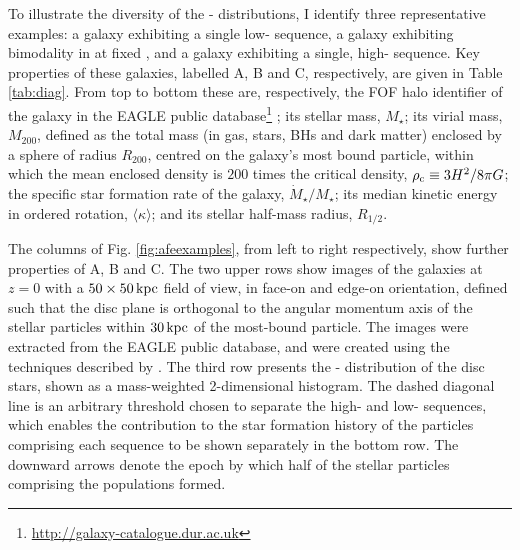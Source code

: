 To illustrate the diversity of the \afe{}-\feh{} distributions, I identify three representative examples: a galaxy exhibiting a single low-\afe{} sequence, a galaxy exhibiting bimodality in \afe{} at fixed \feh{}, and a galaxy exhibiting a single, high-\afe{} sequence. Key properties of these galaxies, labelled A, B and C, respectively, are given in Table \ref{tab:diag}. From top to bottom these are, respectively, the FOF halo identifier of the galaxy in the EAGLE public database\footnote{\url{http://galaxy-catalogue.dur.ac.uk}} \citep{2016A&C....15...72M}; its stellar mass, $M_\star$; its virial mass, $M_{200}$, defined as the total mass (in gas, stars, BHs and dark matter) enclosed by a sphere of radius $R_{200}$, centred on the galaxy's most bound particle, within which the mean enclosed density is $200$ times the critical density, $\rho_{\rm c} \equiv 3H^2/8\pi G$; the specific star formation rate of the galaxy, $\dot{M}_\star/M_\star$; its median kinetic energy in ordered rotation, $\langle \kappa \rangle$; and its stellar half-mass radius, $R_{1/2}$. 

The columns of Fig. \ref{fig:afeexamples}, from left to right respectively, show further properties of A, B and C. The two upper rows show images of the galaxies at $z=0$ with a $50 \times 50\,{\rm kpc}$ field of view, in face-on and edge-on orientation, defined such that the disc plane is orthogonal to the angular momentum axis of the stellar particles within $30\,{\rm kpc}$ of the most-bound particle. The images were extracted from the EAGLE public database, and were created using the techniques described by \citet{2015MNRAS.452.2879T}. The third row presents the \afe{}-\feh{} distribution of the disc stars, shown as a mass-weighted 2-dimensional histogram. The dashed diagonal line is an arbitrary threshold chosen to separate the high- and low-\afe{} sequences, which enables the contribution to the star formation history of the particles comprising each sequence to be shown separately in the bottom row. The downward arrows denote the epoch by which half of the stellar particles comprising the populations formed. 

